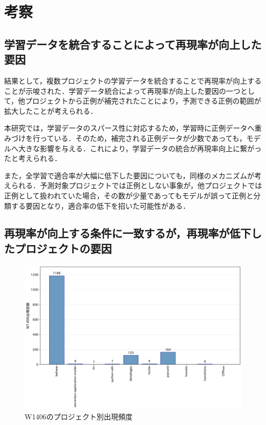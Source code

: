 \documentclass[paper]{ieicej}
\begin{document}
\section{考察}\label{chap:consideration}

\subsection{学習データを統合することによって再現率が向上した要因}

結果として，複数プロジェクトの学習データを統合することで再現率が向上することが示唆された．学習データ統合によって再現率が向上した要因の一つとして，他プロジェクトから正例が補完されたことにより，予測できる正例の範囲が拡大したことが考えられる．

本研究では，学習データのスパース性に対応するため，学習時に正例データへ重みづけを行っている．そのため，補完される正例データが少数であっても，モデルへ大きな影響を与える．これにより，学習データの統合が再現率向上に繋がったと考えられる．

また，全学習で適合率が大幅に低下した要因についても，同様のメカニズムが考えられる．予測対象プロジェクトでは正例としない事象が，他プロジェクトでは正例として扱われていた場合，その数が少量であってもモデルが誤って正例と分類する要因となり，適合率の低下を招いた可能性がある．


\subsection{再現率が向上する条件に一致するが，再現率が低下したプロジェクトの要因}

\begin{figure}[t]
	\centering
	\includegraphics[width=1\linewidth]{fig/w1406_project_comparison.pdf}
	\caption{W1406のプロジェクト別出現頻度}
	\label{fig:w1406}
\end{figure}
\end{document}

